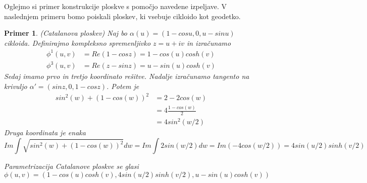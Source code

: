 \documentclass{article}
\newtheorem{primer}{Primer}
\begin{document}
        Oglejmo si primer konstrukcije ploskve s pomočjo navedene izpeljave. V naslednjem primeru bomo poiskali
        ploskev, ki vsebuje cikloido kot geodetko.

        \begin{primer}{(Catalanova ploskev)}
            Naj bo $\alpha (u) = \left( 1 - cos u , 0, u - sin u \right)$ cikloida.
            Definirajmo kompleksno spremenljivko $z = u + i v$ in izračunamo
            \begin{align*}
                \phi^1 (u, v) &= Re (1 - cos z) = 1 - cos (u) cosh (v) \\
                \phi^3 (u, v) &= Re (z - sin z) = u - sin (u) cosh (v)
            \end{align*}
            Sedaj imamo prvo in tretjo koordinato rešitve.
            Nadalje izračunamo tangento na krivuljo $\alpha' = \left( sin z, 0, 1 - cos z \right)$. Potem je
            \begin{align*}
                sin^2 (w) + (1 - cos (w))^2 &= 2 - 2 cos(w) \\
                &= 4 \frac{1 - cos (w)}{2} \\
                &= 4 sin^2 (w/2)
            \end{align*}
            Druga koordinata je enaka
            $$ Im \int \sqrt{sin^2 (w) + (1 - cos (w))^2} dw = Im \int 2 sin(w/2) dw = Im \left(- 4 cos(w/2) \right) = 4 sin(u/2) sinh(v/2)$$
        
            Parametrizacija Catalanove ploskve se glasi
            $$\phi (u, v) = \left( 1 - cos (u) cosh (v), 4 sin(u/2) sinh(v/2), u - sin (u) cosh (v) \right)$$
        \end{primer}
\end{document}
